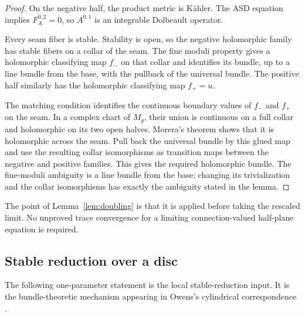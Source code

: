 \documentclass[11pt]{amsart}
\theoremstyle{definition}
\theoremstyle{remark}
\theoremstyle{plain}
\begin{document}
\begin{proof}
On the negative half, the product metric is K\"ahler.  The ASD equation
implies $F_A^{0,2}=0$, so $A^{0,1}$ is an integrable Dolbeault operator.

Every seam fiber is stable.  Stability is open, so the negative
holomorphic family has stable fibers on a collar of the seam.  The fine
moduli property \cite[Section~4]{Owens01} gives a holomorphic classifying
map $f_-$ on that collar and identifies its bundle, up to a line bundle
from the base, with the pullback of the universal bundle.  The positive
half similarly has the holomorphic classifying map $f_+=u$.

The matching condition identifies the continuous boundary values of
$f_-$ and $f_+$ on the seam.  In a complex chart of $M_g$, their union is
continuous on a full collar and holomorphic on its two open halves.
Morera's theorem shows that it is holomorphic across the seam.  Pull back
the universal bundle by this glued map and use the resulting collar
isomorphisms as transition maps between the negative and positive
families.  This gives the required holomorphic bundle.  The fine-moduli
ambiguity is a line bundle from the base; changing its trivialization and
the collar isomorphisms has exactly the ambiguity stated in the lemma.
\end{proof}

The point of Lemma~\ref{lem:doubling} is that it is applied before taking
the rescaled limit.  No unproved trace convergence for a limiting
connection-valued half-plane equation is required.

\subsection{Stable reduction over a disc}\label{sec:disc-reduction}
The following one-parameter statement is the local stable-reduction input.
It is the bundle-theoretic mechanism appearing in Owens's cylindrical
correspondence \cite{Owens01}.
\end{document}
